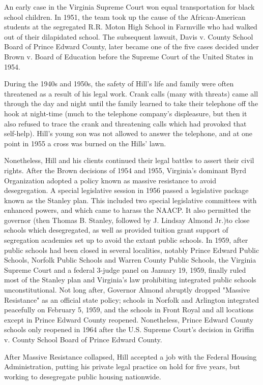An early case in the Virginia Supreme Court won equal transportation for
black school children. In 1951, the team took up the cause of the
African-American students at the segregated R.R. Moton High School in
Farmville who had walked out of their dilapidated school. The subsequent
lawsuit, Davis v. County School Board of Prince Edward County, later
became one of the five cases decided under Brown v. Board of Education
before the Supreme Court of the United States in 1954.

During the 1940s and 1950s, the safety of Hill's life and family were
often threatened as a result of his legal work. Crank calls (many with
threats) came all through the day and night until the family learned to
take their telephone off the hook at night-time (much to the telephone
company's displeasure, but then it also refused to trace the crank and
threatening calls which had provoked that self-help). Hill's young son
was not allowed to answer the telephone, and at one point in 1955 a
cross was burned on the Hills' lawn.

Nonetheless, Hill and his clients continued their legal battles to
assert their civil rights. After the Brown decisions of 1954 and 1955,
Virginia's dominant Byrd Organization adopted a policy known as massive
resistance to avoid desegregation. A special legislative session in 1956
passed a legislative package known as the Stanley plan. This included
two special legislative committees with enhanced powers, and which came
to harass the NAACP. It also permitted the governor (then Thomas B.
Stanley, followed by J. Lindsay Almond Jr.)to close schools which
desegregated, as well as provided tuition grant support of segregation
academies set up to avoid the extant public schools. In 1959, after
public schools had been closed in several localities, notably Prince
Edward Public Schools, Norfolk Public Schools and Warren County Public
Schools, the Virginia Supreme Court and a federal 3-judge panel on
January 19, 1959, finally ruled most of the Stanley plan and Virginia's
law prohibiting integrated public schools unconstitutional. Not long
after, Governor Almond abruptly dropped "Massive Resistance" as an
official state policy; schools in Norfolk and Arlington integrated
peacefully on February 5, 1959, and the schools in Front Royal and all
locations except in Prince Edward County reopened. Nonetheless, Prince
Edward County schools only reopened in 1964 after the U.S. Supreme
Court's decision in Griffin v. County School Board of Prince Edward
County.

After Massive Resistance collapsed, Hill accepted a job with the Federal
Housing Administration, putting his private legal practice on hold for
five years, but working to desegregate public housing nationwide.

